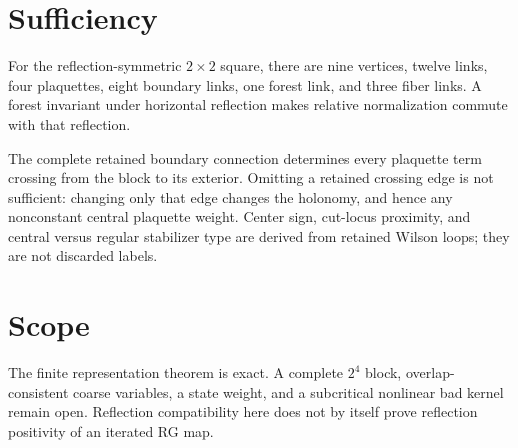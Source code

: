 \documentclass[11pt]{article}
\begin{document}
\section{Sufficiency}
For the reflection-symmetric $2\times2$ square, there are nine vertices,
twelve links, four plaquettes, eight boundary links, one forest link, and three
fiber links.  A forest invariant under horizontal reflection makes relative
normalization commute with that reflection.

The complete retained boundary connection determines every plaquette term
crossing from the block to its exterior.  Omitting a retained crossing edge is
not sufficient: changing only that edge changes the holonomy, and hence any
nonconstant central plaquette weight.  Center sign, cut-locus proximity, and
central versus regular stabilizer type are derived from retained Wilson loops;
they are not discarded labels.

\section{Scope}
The finite representation theorem is exact.  A complete $2^4$ block,
overlap-consistent coarse variables, a state weight, and a subcritical
nonlinear bad kernel remain open.  Reflection compatibility here does not by
itself prove reflection positivity of an iterated RG map.
\end{document}
